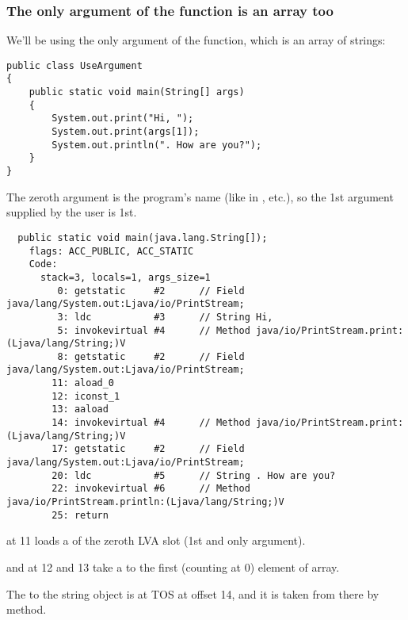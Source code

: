 \subsubsection{The only argument of the \main function is an array too}

We'll be using the only argument of the \main function, which is an array of strings:


\begin{lstlisting}
public class UseArgument
{
	public static void main(String[] args)
	{
		System.out.print("Hi, ");
		System.out.print(args[1]);
		System.out.println(". How are you?");
	}
}
\end{lstlisting}

The zeroth argument is the program's name (like in \CCpp, etc.), 
so the 1st argument supplied by the user is 1st.


\begin{lstlisting}
  public static void main(java.lang.String[]);
    flags: ACC_PUBLIC, ACC_STATIC
    Code:
      stack=3, locals=1, args_size=1
         0: getstatic     #2      // Field java/lang/System.out:Ljava/io/PrintStream;
         3: ldc           #3      // String Hi, 
         5: invokevirtual #4      // Method java/io/PrintStream.print:(Ljava/lang/String;)V
         8: getstatic     #2      // Field java/lang/System.out:Ljava/io/PrintStream;
        11: aload_0       
        12: iconst_1      
        13: aaload        
        14: invokevirtual #4      // Method java/io/PrintStream.print:(Ljava/lang/String;)V
        17: getstatic     #2      // Field java/lang/System.out:Ljava/io/PrintStream;
        20: ldc           #5      // String . How are you?
        22: invokevirtual #6      // Method java/io/PrintStream.println:(Ljava/lang/String;)V
        25: return        
\end{lstlisting}

 at 11 loads a  of the zeroth \ac{LVA} slot 
(1st and only \main argument).

 and  at 12 and 13 take a  to the first (counting at 0) 
element of array.

The  to the string object is at \ac{TOS} at offset 14, and it is 
taken from there by  method.


